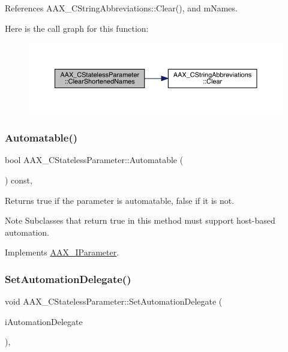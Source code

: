 References A\+A\+X\+\_\+\+C\+String\+Abbreviations\+::\+Clear(), and m\+Names.

Here is the call graph for this function\+:
\nopagebreak
\begin{figure}[H]
\begin{center}
\leavevmode
\includegraphics[width=350pt]{a01541_a1a3829b633e0eeb8771d2cacc9b1ac70_cgraph}
\end{center}
\end{figure}
\mbox{\label{a01541_a94d8ff19d89cd2d2024f45f7763abfab}} 
\subsubsection{\texorpdfstring{Automatable()}{Automatable()}}
{\footnotesize\ttfamily bool A\+A\+X\+\_\+\+C\+Stateless\+Parameter\+::\+Automatable (\begin{DoxyParamCaption}{ }\end{DoxyParamCaption}) const\hspace{0.3cm}{\ttfamily [inline]}, {\ttfamily [virtual]}}



Returns true if the parameter is automatable, false if it is not. 

\begin{DoxyNote}{Note}
Subclasses that return true in this method must support host-\/based automation. 
\end{DoxyNote}


Implements \mbox{\hyperlink{a01857_a253ff336b79cfb454f07d4fa21f2884f}{A\+A\+X\+\_\+\+I\+Parameter}}.

\mbox{\label{a01541_acaf1f39e881c14fb3b81f9c0c23fea31}} 
\subsubsection{\texorpdfstring{SetAutomationDelegate()}{SetAutomationDelegate()}}
{\footnotesize\ttfamily void A\+A\+X\+\_\+\+C\+Stateless\+Parameter\+::\+Set\+Automation\+Delegate (\begin{DoxyParamCaption}\item[{\mbox{\hyperlink{a01773}{A\+A\+X\+\_\+\+I\+Automation\+Delegate}} $\ast$}]{i\+Automation\+Delegate }\end{DoxyParamCaption})\hspace{0.3cm}{\ttfamily [inline]}, {\ttfamily [virtual]}}



